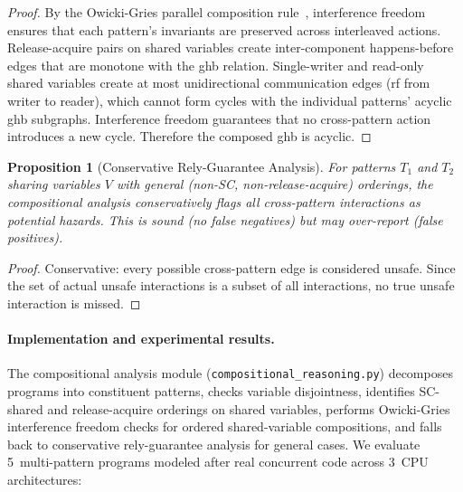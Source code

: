 \documentclass[11pt]{article}
\newtheorem{proposition}[theorem]{Proposition}
\begin{document}
\begin{proof}
By the Owicki-Gries parallel composition rule~\cite{OwickiGries1976},
interference freedom ensures that each pattern's invariants are preserved
across interleaved actions. Release-acquire pairs on shared variables
create inter-component happens-before edges that are monotone with
the ghb relation. Single-writer and read-only shared variables create
at most unidirectional communication edges (rf from writer to reader),
which cannot form cycles with the individual patterns' acyclic ghb
subgraphs. Interference freedom guarantees that no cross-pattern
action introduces a new cycle. Therefore the composed ghb is acyclic.
\end{proof}

\begin{proposition}[Conservative Rely-Guarantee Analysis]
\label{prop:rg-conservative}
For patterns $T_1$ and $T_2$ sharing variables $V$ with general
(non-SC, non-release-acquire) orderings, the compositional analysis
conservatively flags all cross-pattern interactions as potential hazards.
This is sound (no false negatives) but may over-report (false positives).
\end{proposition}

\begin{proof}
Conservative: every possible cross-pattern edge is considered unsafe.
Since the set of actual unsafe interactions is a subset of all
interactions, no true unsafe interaction is missed.
\end{proof}

\paragraph{Implementation and experimental results.}
The compositional analysis module\linebreak
(\texttt{compositional\_reasoning.py})
decomposes programs into constituent patterns, checks variable
disjointness, identifies SC-shared and release-acquire orderings
on shared variables, performs Owicki-Gries interference freedom
checks for ordered shared-variable compositions, and falls back
to conservative rely-guarantee analysis for general cases.
We evaluate 5~multi-pattern programs modeled after real concurrent code
across 3~CPU architectures:
\end{document}
